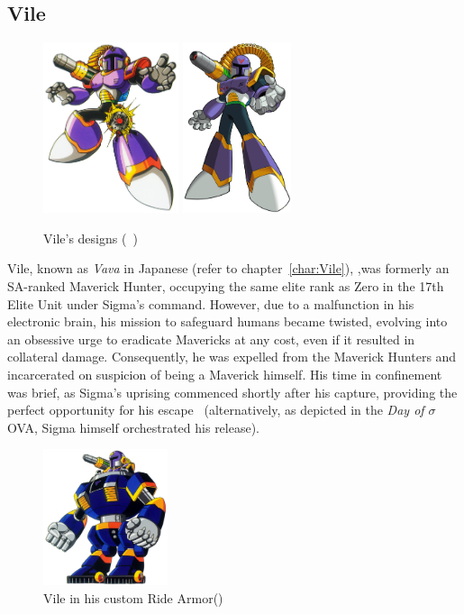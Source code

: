 \subsection{Vile}\label{boss:vile}
\begin{figure}[htp]
	\centering
	\includegraphics[height=5cm]{figures/X1/Sigma_stages/Vile.jpg}
	\includegraphics[height=5cm]{figures/X1/Sigma_stages/MhxVile.png}
	\caption{Vile's designs (~\cite{book:MMX_Complete_art})}
\end{figure}
Vile, known as \textit{Vava} in Japanese (refer to chapter~\ref{char:Vile}), ,was formerly an SA-ranked Maverick Hunter, occupying the same elite rank as Zero in the 17th Elite Unit under Sigma's command. However, due to a malfunction in his electronic brain, his mission to safeguard humans became twisted, evolving into an obsessive urge to eradicate Mavericks at any cost, even if it resulted in collateral damage. Consequently, he was expelled from the Maverick Hunters and incarcerated on suspicion of being a Maverick himself. His time in confinement was brief, as Sigma's uprising commenced shortly after his capture, providing the perfect opportunity for his escape~\cite{Xcoll1:Manual_X1,MHX:manual, wayback:X_resources} (alternatively, as depicted in the \textit{Day of $\sigma$} OVA, Sigma himself orchestrated his release).
\begin{figure}[htp]
	\centering
	\includegraphics[height=4cm]{figures/X1/Sigma_stages/VileRideArmor.jpg}
	\caption{Vile in his custom Ride Armor(\cite{book:MMX_Complete_art})}
\end{figure}

